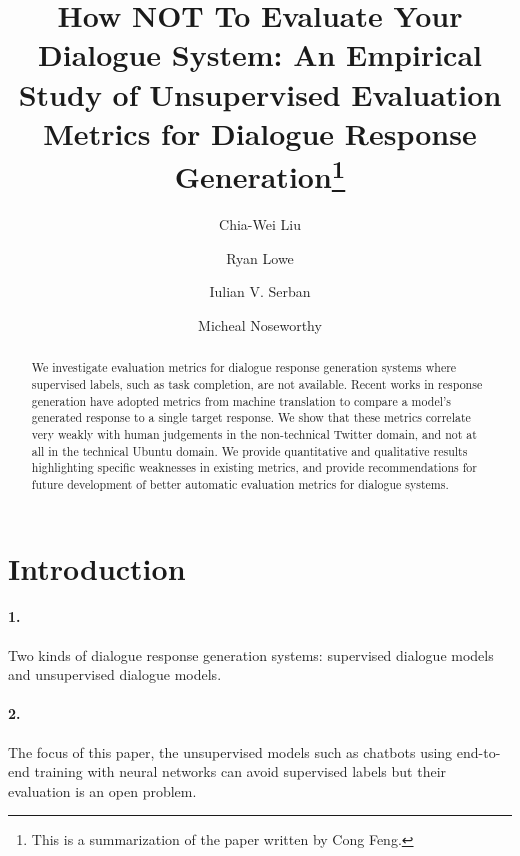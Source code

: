 \documentclass[runningheads]{llncs}
\begin{document}
\title{How NOT To Evaluate Your Dialogue System: An Empirical Study of
Unsupervised Evaluation Metrics for Dialogue Response Generation\thanks{
This is a summarization of the paper written by Cong Feng.
}}


\author{Chia-Wei Liu  \and Ryan Lowe  \and
Iulian V. Serban  \and Micheal Noseworthy }


\maketitle

\begin{abstract}
    We investigate evaluation metrics for dialogue
    response generation systems where supervised
    labels, such as task completion, are not available.
    Recent works in response generation
    have adopted metrics from machine translation
    to compare a model’s generated response
    to a single target response. We show that
    these metrics correlate very weakly with human
    judgements in the non-technical Twitter
    domain, and not at all in the technical Ubuntu
    domain. We provide quantitative and qualitative
    results highlighting specific weaknesses
    in existing metrics, and provide recommendations
    for future development of better automatic
    evaluation metrics for dialogue systems.
\end{abstract}

\section{Introduction}
\paragraph{1.} Two kinds of dialogue response generation systems:
supervised dialogue models and unsupervised dialogue models.

\paragraph{2. } The focus of this paper,
the unsupervised models such as chatbots using end-to-end training
with neural networks can avoid supervised labels but their
evaluation is an open problem.
\end{document}
